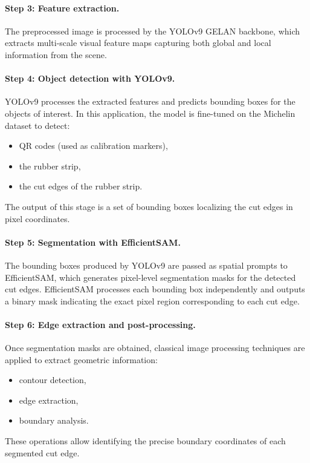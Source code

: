 \documentclass[11pt]{article}
\begin{document}
\paragraph{Step 3: Feature extraction.}
The preprocessed image is processed by the YOLOv9 GELAN backbone, which extracts 
multi-scale visual feature maps capturing both global and local information from 
the scene.

\paragraph{Step 4: Object detection with YOLOv9.}
YOLOv9 processes the extracted features and predicts bounding boxes for the objects 
of interest. In this application, the model is fine-tuned on the Michelin dataset 
to detect:
\begin{itemize}
    \item QR codes (used as calibration markers),
    \item the rubber strip,
    \item the cut edges of the rubber strip.
\end{itemize}
The output of this stage is a set of bounding boxes localizing the cut edges in 
pixel coordinates.

\paragraph{Step 5: Segmentation with EfficientSAM.}
The bounding boxes produced by YOLOv9 are passed as spatial prompts to EfficientSAM, 
which generates pixel-level segmentation masks for the detected cut edges. EfficientSAM 
processes each bounding box independently and outputs a binary mask indicating the 
exact pixel region corresponding to each cut edge.

\paragraph{Step 6: Edge extraction and post-processing.}
Once segmentation masks are obtained, classical image processing techniques are applied 
to extract geometric information:
\begin{itemize}
    \item contour detection,
    \item edge extraction,
    \item boundary analysis.
\end{itemize}
These operations allow identifying the precise boundary coordinates of each segmented 
cut edge.
\end{document}
